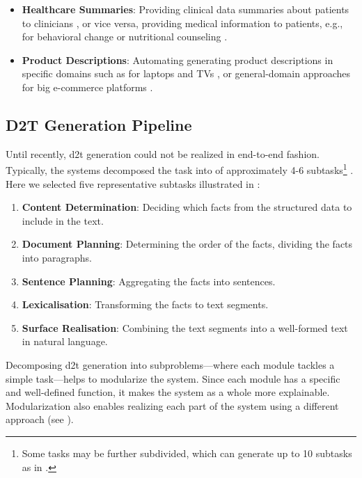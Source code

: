 \begin{itemize}
    \item \textbf{Healthcare Summaries}: Providing  clinical data summaries about patients to clinicians \cite{portet2009automatic,scott2013data}, or vice versa, providing medical information to patients, e.g., for behavioral change \cite{reiter2003lessons} or nutritional counseling \cite{balloccu-reiter-2022-comparing}.
    \item \textbf{Product Descriptions}: Automating generating product descriptions in specific domains such as for laptops and TVs \cite{wen2015toward,wen2016multi}, or general-domain approaches for big e-commerce platforms \cite{shaoControllableDiverseText2021,kotoCanPretrainedLanguage2022}.
\end{itemize}

\subsection{D2T Generation Pipeline}
\label{sec:d2t-pipeline}
Until recently, \ac{d2t} generation could not be realized in end-to-end fashion. Typically, the systems decomposed the task into of approximately 4-6 subtasks\footnote{Some tasks may be further subdivided, which can generate up to 10 subtasks as in \citet{milleModD2TMultilayerDataset2023}.} \cite{reiterBuildingAppliedNatural1997,reiterArchitectureDatatoTextSystems2007,gattSurveyStateArt2018}. Here we selected five representative subtasks illustrated in :

\begin{enumerate}
    \item \textbf{Content Determination}: Deciding which facts from the structured data
          to include in the text.
    \item \textbf{Document Planning}: Determining the order of the
          facts, dividing the facts into paragraphs.
    \item \textbf{Sentence Planning}: Aggregating the facts into
          sentences.
    \item \textbf{Lexicalisation}: Transforming the facts to text segments.
    \item \textbf{Surface Realisation}: Combining the text segments into a well-formed text in natural language.
\end{enumerate}

Decomposing \ac{d2t} generation into subproblems---where each module tackles a simple task---helps to modularize the system. Since each module has a specific and well-defined function, it makes the system as a whole more explainable. Modularization also enables realizing each part of the system using a different approach (see ).

